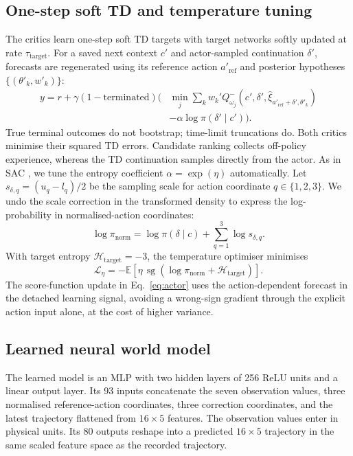\documentclass[12pt]{article}
\newcommand{\expect}{\mathbb{E}}
\newcommand{\sg}{\operatorname{sg}}
\begin{document}
\subsection{One-step soft TD and temperature tuning}
The critics learn one-step soft TD targets with target networks softly updated at rate $\tau_{\mathrm{target}}$. For a saved next context $c'$ and actor-sampled continuation $\delta'$, forecasts are regenerated using its reference action $a'_{\mathrm{ref}}$ and posterior hypotheses $\{(\theta'_k,w'_k)\}$:
\begin{equation}\label{eq:td}
\begin{aligned}
y=r+\gamma(1-\mathrm{terminated})\Big(&\min_j\sum_k w_k'
Q^-_{\omega_j}\!\left(c',\delta',\hat{\xi}_{a'_{\mathrm{ref}}+\delta',\theta'_k}\right)\\
&-\alpha\log\pi(\delta'\mid c')\Big).
\end{aligned}
\end{equation}
True terminal outcomes do not bootstrap; time-limit truncations do. Both critics minimise their squared TD errors. Candidate ranking collects off-policy experience, whereas the TD continuation samples directly from the actor. As in SAC \cite{sacauto}, we tune the entropy coefficient $\alpha=\exp(\eta)$ automatically. Let $s_{\delta,q}=(u_q-l_q)/2$ be the sampling scale for action coordinate $q\in\{1,2,3\}$. We undo the scale correction in the transformed density to express the log-probability in normalised-action coordinates:
\begin{equation}
\log\pi_{\mathrm{norm}}=\log\pi(\delta\mid c)+\sum_{q=1}^{3}\log s_{\delta,q}.
\end{equation}
With target entropy $\mathcal H_{\mathrm{target}}=-3$, the temperature optimiser minimises
\begin{equation}
\mathcal L_{\eta}=-\expect\!\left[\eta\,\sg\!\left(\log\pi_{\mathrm{norm}}+\mathcal H_{\mathrm{target}}\right)\right].
\label{eq:temperature}
\end{equation}
The score-function update in Eq.~\eqref{eq:actor} uses the action-dependent forecast in the detached learning signal, avoiding a wrong-sign gradient through the explicit action input alone, at the cost of higher variance.

\subsection{Learned neural world model}\label{app:learned-model}
The learned model is an MLP with two hidden layers of 256 ReLU units and a linear output layer. Its 93 inputs concatenate the seven observation values, three normalised reference-action coordinates, three correction coordinates, and the latest trajectory flattened from $16\times5$ features. The observation values enter in physical units. Its 80 outputs reshape into a predicted $16\times5$ trajectory in the same scaled feature space as the recorded trajectory.
\end{document}
